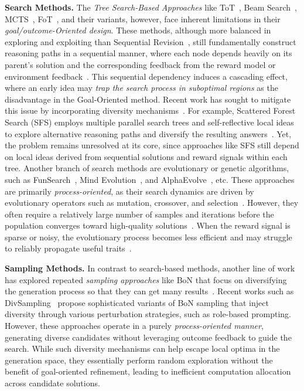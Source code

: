\documentclass{article} %
\theoremstyle{definition}
\theoremstyle{remark}
\begin{document}
\textbf{Search Methods.} The \textit{Tree Search-Based Approaches} like ToT~\citep{yao2023tree}, Beam Search~\citep{Freitag_2017}, MCTS~\citep{MCTSGo}, FoT~\citep{bi2025forestofthought}, and their variants, however, face inherent limitations in their \textit{goal/outcome-Oriented design}. These methods, although more balanced in exploring and exploiting than Sequential Revision~\citep{snell2025scaling}, still fundamentally construct reasoning paths in a sequential manner, where each node depends heavily on its parent’s solution and the corresponding feedback from the reward model or environment feedback~\citep{yao2023tree, zhang2025aflow, light2025strategist, wu2025inference}. This sequential dependency induces a cascading effect, where an early idea may \textit{trap the search process in suboptimal regions} as the disadvantage in the Goal-Oriented method. Recent work has sought to mitigate this issue by incorporating diversity mechanisms~\citep{light2025sfs, bi2025forestofthought}. For example, Scattered Forest Search (SFS) employs multiple parallel search trees and self-reflective local ideas to explore alternative reasoning paths and diversify the resulting answers~\citep{light2025sfs}. Yet, the problem remains unresolved at its core, since approaches like SFS still depend on local ideas derived from sequential solutions and reward signals within each tree. Another branch of search methods are evolutionary or genetic algorithms, such as FunSearch~\citep{FunSearch2023}, Mind Evolution~\citep{lee2025evolvingdeeperllmthinking}, and AlphaEvolve~\citep{novikov2025alphaevolve}, etc. These approaches are primarily \textit{process-oriented}, as their search dynamics are driven by evolutionary operators such as mutation, crossover, and selection~\citep{gao2025survey}. However, they often require a relatively large number of samples and iterations before the population converges toward high-quality solutions~\citep{DeJong2016}. When the reward signal is sparse or noisy, the evolutionary process becomes less efficient and may struggle to reliably propagate useful traits~\citep{Eiben2015}.














\textbf{Sampling Methods.} In contrast to search-based methods, another line of work has explored repeated \textit{sampling approaches} like BoN that focus on diversifying the generation process so that they can get many results~\citep{li-etal-2023-making, wang2025diversified, Mu2024DDPromptDD}. Recent works such as DivSampling~\citep{wang2025diversified} propose sophisticated variants of BoN sampling that inject diversity through various perturbation strategies, such as role-based prompting. However, these approaches operate in a purely \textit{process-oriented manner}, generating diverse candidates without leveraging outcome feedback to guide the search. While such diversity mechanisms can help escape local optima in the generation space, they essentially perform random exploration without the benefit of goal-oriented refinement, leading to inefficient computation allocation across candidate solutions.
\end{document}
